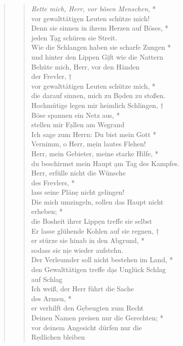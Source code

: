 \begin{quote}



\begin{verse}
 \textit{Rette mich, Herr, vor bösen Menschen,} *\\
vor gewalttätig\d en Leuten schütze mich! \\ \vin
Denn sie sinnen in ihrem Herzen auf Böses, *\\ \vin
jeden T\d ag schüren sie Streit.\\
Wie die Schlangen haben sie scharfe Zungen *\\
und hinter den Lippen G\d ift wie die Nattern\\ \vin 
Behüte mich, Herr, vor den Händen\\ \vin der Frevler, †\\ \vin
vor gewalttätigen Leuten schütze mich, *\\ \vin die darauf sinnen, mich zu B\d oden zu stoßen.\\
Hochmütige legen mir heimlich Schlingen, †\\
Böse spannen ein Netz aus, *\\ stellen mir F\d allen am Wegrand\\ \vin
Ich sage zum Herrn: Du bist mein Gott *\\ \vin 
Vernimm, o Herr, m\d ein lautes Flehen! \\
Herr, mein Gebieter, meine starke Hilfe, *\\ 
du beschirmst mein Haupt \d am Tag des Kampfes.\\ \vin
Herr, erfülle nicht die Wünsche \\ \vin des Frevlers, *\\ \vin
lass seine Plän\d e nicht gelingen! \\
Die mich umzingeln, sollen das Haupt nicht\\  erheben; *\\
die Bosheit ihrer Lipp\d en treffe sie selbst\\ \vin 
Er lasse glühende Kohlen auf sie regnen, †\\ \vin
er stürze sie hinab in den Abgrund, *\\ \vin sodass sie n\d ie wieder aufstehn.\\ 
Der Verleumder soll nicht bestehen im Land, *\\
den Gewalttätigen treffe d\d as Unglück Schlag \\auf Schlag\\ \vin
Ich weiß, der Herr führt die Sache\\ \vin  des Armen, *\\ \vin
er verhilft den G\d ebeugten zum Recht\\
Deinen Namen preisen nur die Gerechten; *\\
vor deinem Angesicht dürfen nur die\\ R\d edlichen bleiben\\ 
\end{verse}

 
\end{quote}
\vspace{0.3cm}

